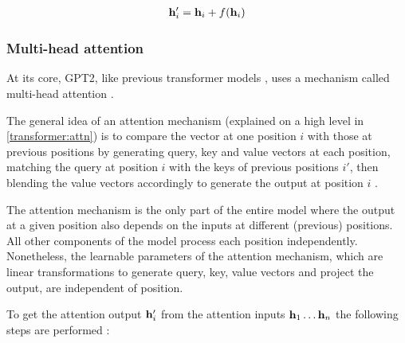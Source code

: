 \begin{align}
	{\mathbf{h}}'_i = {\mathbf{h}}_i + f({\mathbf{h}}_i)
	\label{eq:gpt2_res}
\end{align}


\subsubsection{Multi-head attention}
\label{gpt2:attn}

At its core, GPT2, like previous transformer models , uses a mechanism called multi-head attention .

The general idea of an attention mechanism (explained on a high level in \cref{transformer:attn}) is to compare the vector at one position $i$ with those at previous positions by generating query, key and value vectors at each position, matching the query at position $i$ with the keys of previous positions $i'$, then blending the value vectors accordingly to generate the output at position $i$ \cite{alammar-transformer} \cite{alammar-gpt2}.

The attention mechanism is the only part of the entire model where the output at a given position also depends on the inputs at different (previous) positions. All other components of the model process each position independently.
Nonetheless, the learnable parameters of the attention mechanism, which are linear transformations to generate query, key, value vectors and project the output, are independent of position.

To get the attention output ${\mathbf{h}}'_i$ from the attention inputs ${\mathbf{h}}_1 \ldots {\mathbf{h}}_n$ the following steps are performed  \cite{alammar-transformer} \cite{alammar-gpt2}:

